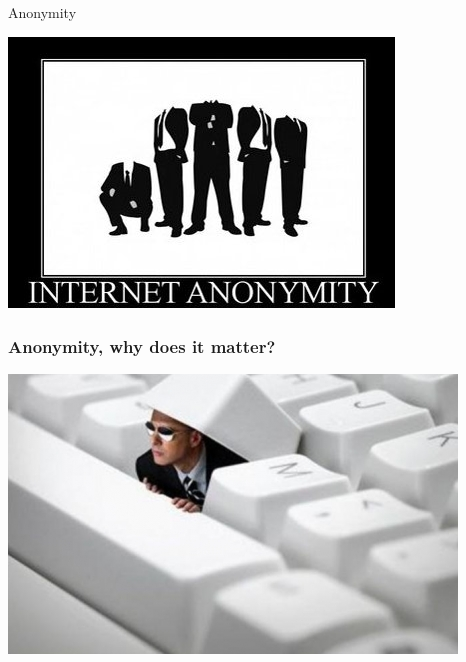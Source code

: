 \begin{frame}
\begin{center}
\huge{Anonymity}
\end{center}
\begin{center}
\includegraphics[scale=0.5] {./materials/anonymity1.jpg} 
\end{center}
\end{frame}


\begin{frame}
\frametitle{Anonymity, why does it matter?}
\begin{center}
\includegraphics[scale=0.45] {./materials/vie_privee.jpg} 
\end{center}
\end{frame}
